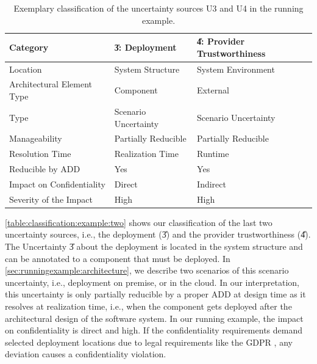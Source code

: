 \begin{table}
    \centering
    \begin{tabular}{lll}
        \toprule
        Category                        & \U{3}: Deployment   & \U{4}: Provider Trustworthiness \\
        \midrule
        Location                        & System Structure          & System Environment \\
        Architectural Element Type\;    & Component                 & External \\
        Type                            & Scenario Uncertainty\;    & Scenario Uncertainty \\
        Manageability                   & Partially Reducible       & Partially Reducible \\
        Resolution Time                 & Realization Time          & Runtime \\
        Reducible by ADD                & Yes                       & Yes \\
        Impact on Confidentiality       & Direct                    & Indirect \\
        Severity of the Impact          & High                      & High \\
        \bottomrule
    \end{tabular}
    \caption{Exemplary classification of the uncertainty sources U3 and U4 in the running example.}%
    \label{table:classification:example:two}
\end{table}

\autoref{table:classification:example:two} shows our classification of the last two uncertainty sources, i.e., the deployment (\U{3}) and the provider trustworthiness (\U{4}). 
The Uncertainty \U{3} about the deployment is located in the system structure and can be annotated to a component that must be deployed.
In \autoref{sec:runningexample:architecture}, we describe two scenarios of this scenario uncertainty, i.e., deployment on premise, or in the cloud.
In our interpretation, this uncertainty is only partially reducible by a proper \ac{ADD} at design time as it resolves at realization time, i.e., when the component gets deployed after the architectural design of the software system.
In our running example, the impact on confidentiality is direct and high.
If the confidentiality requirements demand selected deployment locations due to legal requirements like the \ac{GDPR} \cite{council_of_european_union_regulation_2016}, any deviation causes a confidentiality violation.

